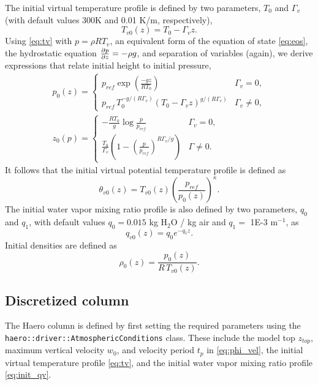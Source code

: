 The initial virtual temperature profile is defined by two parameters, $T_{0}$ and $\Gamma_v$ (with default values 300K and 0.01 K/m, respectively),
\begin{equation}\label{eq:tv}
  T_{v0}(z) = T_{0} - \Gamma_v z.
\end{equation}
Using \eqref{eq:tv} with $p=\rho R T_v$, an equivalent form of the equation of state \eqref{eq:eos}, the hydrostatic equation $\frac{\partial p }{\partial z} = -\rho g$, and separation of variables (again), we derive expressions that relate initial height to initial pressure,
\begin{align}
  p_0(z) = \begin{cases}
          p_{ref}\exp\left(\frac{-g z}{R T_{0}}\right) & \Gamma_v = 0,\\[0.5em]
          p_{ref}\, T_0^{-g/(R\Gamma_v)}\left(T_{0} - \Gamma_v z\right)^{g/(R\Gamma_v)} & \Gamma_v \ne 0,
        \end{cases} \label{eq:p_of_z}\\[0.5em]
  z_0(p) = \begin{cases}
         -\frac{R T_{0}}{g}\log\frac{p}{p_{ref}} & \Gamma_v = 0,\\[0.5em]
         \frac{T_{0}}{\Gamma_v}\left(1 - \left(\frac{p}{p_{ref}}\right)^{R\Gamma_v/g}\right) & \Gamma \ne 0.
       \end{cases}\label{eq:z_of_p}
\end{align}
It follows that the initial virtual potential temperature profile is defined as
\begin{equation}
  \theta_{v0}(z) = T_{v0}(z)\left(\frac{p_{ref}}{p_0(z)}\right)^\kappa.
\end{equation}
The initial water vapor mixing ratio profile is also defined by two parameters, $q_0$ and $q_1$, with default values $q_0=0.015$ kg H$_2$O / kg air and $q_1 = $ 1E-3 m$^{-1}$, as
\begin{equation}\label{eq:init_qv}
  q_{v0}(z) = q_0e^{-q_1 z}.
\end{equation}
Initial densities are defined as
\begin{equation}
  \rho_0(z) = \frac{p_0(z)}{R\,T_{v0}(z)}.
\end{equation}

\subsection{Discretized column}

The Haero column is defined by first setting the required parameters using the \texttt{haero::driver::AtmosphericConditions} class.
These include the model top $z_{top}$, maximum vertical velocity $w_0$, and velocity period $t_p$ in \eqref{eq:phi_vel}, the initial virtual temperature profile \eqref{eq:tv}, and the initial water vapor mixing ratio profile \eqref{eq:init_qv}.

